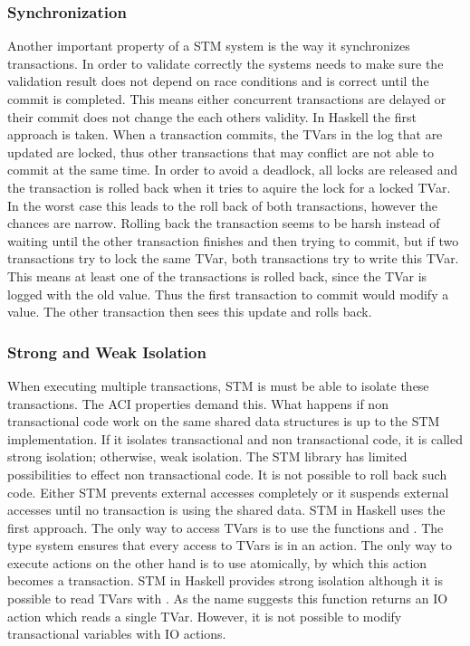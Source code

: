 \subsubsection{Synchronization} Another important property of a STM system is the way it synchronizes transactions. In order to validate
correctly the systems needs to make sure the validation result does not depend on race conditions and is correct until the commit 
is completed. This means either concurrent transactions are delayed or their commit does not change the each others validity. In Haskell the first
approach is taken. When a transaction commits, the TVars in the log that are updated are locked, thus other transactions that may conflict are not 
able to commit at the same time. In order to avoid a deadlock, all locks are released and the transaction
is rolled back when it tries to aquire the lock for a locked TVar. In the worst case this leads to the roll back of both transactions, 
however the chances are narrow. Rolling back the transaction seems to be harsh instead of waiting until the other transaction finishes 
and then trying to commit, but if two transactions try to lock the same TVar, both transactions try to write this TVar. 
This means at least one of the transactions is rolled back, since the TVar is logged with the old value. 
Thus the first transaction to commit would modify a value. The other transaction then sees this update and rolls back.

\subsubsection{Strong and Weak Isolation} When executing multiple transactions, STM is must be able to isolate these transactions.
The ACI properties demand this. What happens if non transactional code work on the same shared data structures is up to the STM 
implementation. If it isolates transactional and non transactional code, it is called strong isolation; otherwise, weak isolation.
The STM library has limited possibilities to effect non transactional code. It is not possible to roll back such code. Either STM prevents 
external accesses completely or it suspends external accesses until no transaction is using the shared data. STM in Haskell uses 
the first approach. The only way to access TVars is to use the functions  and . The type system 
ensures that every access to TVars is in an  action. The only way to execute  actions on the other hand is
to use atomically, by which this action becomes a transaction. STM in Haskell provides strong isolation although it is possible 
to read TVars with . As the name suggests this function returns an IO action which reads a single TVar. 
However, it is not possible to modify transactional variables with IO actions. 


